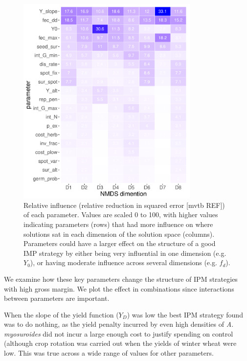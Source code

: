 \documentclass[12pt, a4paper]{article}
\begin{document}
\begin{figure}[!ht]
	\includegraphics[width=90mm]{MS_figs/rel_inf_matrix_plot.pdf}
	\caption{Relative influence (relative reduction in squared error [mvtb REF]) of each parameter. Values are scaled 0 to 100, with higher values indicating parameters (rows) that had more influence on where solutions sat in each dimension of the solution space (columns). Parameters could have a larger effect on the structure of a good IMP strategy by either being very influential in one dimension (e.g. $Y_0$), or having moderate influence across several dimensions (e.g. $f_d$).}
	\label{fig:rel_inf} 
\end{figure}

We examine how these key parameters change the structure of IPM strategies with high gross margin. We plot the effect in combinations since interactions between parameters are important.

When the slope of the yield function ($Y_D$) was low the best IPM strategy found was to do nothing, as the yield penalty incurred by even high densities of \textit{A. myosuroides} did not incur a large enough cost to justify spending on control (although crop rotation was carried out when the yields of winter wheat were low. This was true across a wide range of values for other parameters. 
\end{document}
